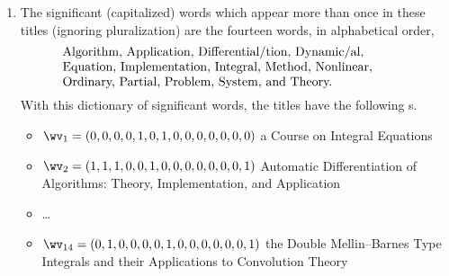\begin{enumerate}
\item  The significant (capitalized) words which appear more than once in these titles (ignoring pluralization) are the fourteen words, in alphabetical order,
\begin{equation}
\parbox{0.8\linewidth}{\raggedright
Algorithm,
Application,
Differential/tion,
Dynamic/al,
Equation,
Implementation,
Integral,
Method,
Nonlinear,
Ordinary,
Partial,
Problem,
System, and
Theory.}
\label{eq:lsidict}
\end{equation}
With this dictionary of significant words, the titles have the following s.
\begin{itemize}
\item \(\wv_1=(0,0,0,0,1,0,1,0,0,0,0,0,0,0)\) a Course on Integral Equations
\item \(\wv_2=(1,1,1,0,0,1,0,0,0,0,0,0,0,1)\) Automatic Differentiation of Algorithms: Theory, Implementation, and Application
\item \ldots
\item \(\wv_{14}=(0,1,0,0,0,0,1,0,0,0,0,0,0,1)\) the Double Mellin--Barnes Type Integrals and their Applications to Convolution Theory
\end{itemize}



\end{enumerate}
